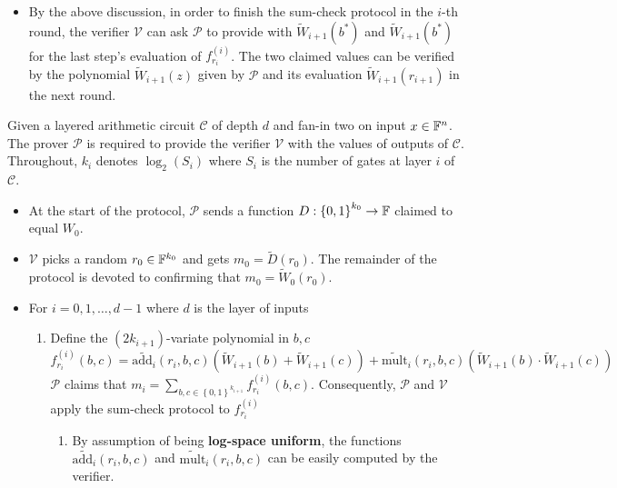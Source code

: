 \documentclass{article}
\begin{document}
\begin{itemize}
\begin{lemma}
\end{lemma} 
\item By the above discussion, in order to finish the sum-check protocol in the $i$-th round, the verifier $\mathcal{V}$ can ask $\mathcal{P}$ to provide with $\widetilde{W}_{i+1}(b^{*})$ and $\widetilde{W}_{i+1}(b^{*})$ for the last step's evaluation of $f_{r_i}^{(i)}$. The two claimed values can be verified by the polynomial $\widetilde{W}_{i+1}(z)$ given by $\mathcal{P}$ and its evaluation $\widetilde{W}_{i+1}(r_{i+1})$ in the next round.  
\end{itemize}

\begin{boxx1} \label{def:GKR-protocol}
Given a layered arithmetic circuit $\mathcal{C}$ of depth $d$ and fan-in two on input $x \in \mathbb{F}^n$. The prover $\mathcal{P}$ is required to provide the verifier $\mathcal{V}$ with the values of outputs of $\mathcal{C}$. Throughout, $k_i$ denotes $\log_2(S_i)$ where $S_{i}$ is the number of gates at layer $i$ of $\mathcal{C}$. 
\begin{itemize}
\item At the start of the protocol, $\mathcal{P}$ sends a function $D: \left\{ 0, 1 \right\}^{k_0} \rightarrow \mathbb{F}$ claimed to equal $W_0$. 
\item $\mathcal{V}$ picks a random $r_0 \in \mathbb{F}^{k_0}$ and gets $m_0 = \widetilde{D}(r_0)$. The remainder of the protocol is devoted to confirming that $m_0 = \widetilde{W}_0(r_0)$.
\item For $i = 0, 1, \dots, d-1$ where $d$ is the layer of inputs
\begin{enumerate}[$\circ$]
\item\label{item:17} Define the $(2k_{i+1})$-variate polynomial in $b, c$
\begin{equation*}
f_{r_i}^{(i)}(b, c) =  \widetilde{\text{add}_i}(r_i, b, c)(\widetilde{W}_{i+1}(b) + \widetilde{W}_{i+1}(c)) + \widetilde{\text{mult}}_i(r_{i}, b, c)(\widetilde{W}_{i+1}(b) \cdot \widetilde{W}_{i + 1}(c))
\end{equation*}
$\mathcal{P}$ claims that $m_i = \sum_{b, c \in \left\{ 0, 1 \right\}^{k_{i+1}}} f_{r_i}^{(i)}(b, c)$. Consequently, $\mathcal{P}$ and $\mathcal{V}$ apply the sum-check protocol to $f_{r_i}^{(i)}$
\begin{enumerate}[-]
\item\label{item:51} By assumption of being \textbf{log-space uniform}, the functions $ \widetilde{\text{add}_i}(r_i, b, c)$ and $\widetilde{\text{mult}}_i(r_{i}, b, c)$ can be easily computed by the verifier. 

\end{enumerate}
\end{enumerate}
\end{itemize}
\end{boxx1}
\end{document}
